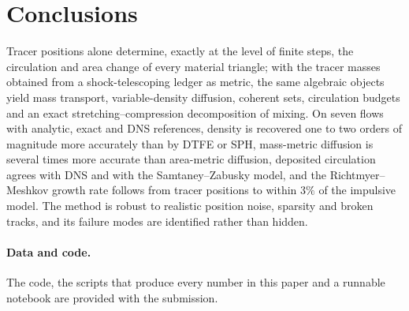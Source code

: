 \documentclass[11pt]{article}
\theoremstyle{definition}\newtheorem{definition}{Definition}\theoremstyle{remark}\newtheorem{remark}{Remark}
\begin{document}
\section{Conclusions}
Tracer positions alone determine, exactly at the level of finite steps, the circulation and area change of every material triangle; with the tracer masses obtained from a shock-telescoping ledger as metric, the same algebraic objects yield mass transport, variable-density diffusion, coherent sets, circulation budgets and an exact stretching--compression decomposition of mixing. On seven flows with analytic, exact and DNS references, density is recovered one to two orders of magnitude more accurately than by DTFE or SPH, mass-metric diffusion is several times more accurate than area-metric diffusion, deposited circulation agrees with DNS and with the Samtaney--Zabusky model, and the Richtmyer--Meshkov growth rate follows from tracer positions to within $3\%$ of the impulsive model. The method is robust to realistic position noise, sparsity and broken tracks, and its failure modes are identified rather than hidden.

\paragraph{Data and code.} The code, the scripts that produce every number in this paper and a runnable notebook are provided with the submission.
\end{document}
